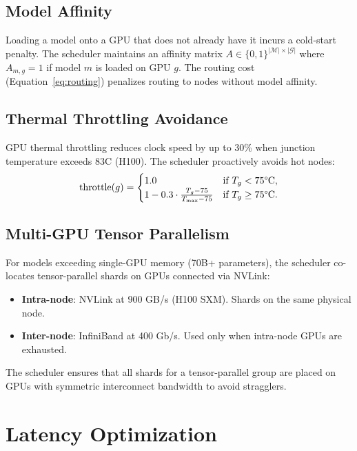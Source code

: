 \documentclass[11pt]{article}
\begin{document}
\subsection{Model Affinity}

Loading a model onto a GPU that does not already have it incurs a cold-start
penalty. The scheduler maintains an affinity matrix $A \in \{0,1\}^{|\mathcal{M}|
\times |\mathcal{G}|}$ where $A_{m,g} = 1$ if model $m$ is loaded on GPU $g$.
The routing cost (Equation~\ref{eq:routing}) penalizes routing to nodes without
model affinity.

\subsection{Thermal Throttling Avoidance}

GPU thermal throttling reduces clock speed by up to 30\% when junction
temperature exceeds 83\textdegree C (H100). The scheduler proactively avoids
hot nodes:
\begin{equation}
\text{throttle}(g) = \begin{cases}
    1.0 & \text{if } T_g < 75\text{\textdegree C}, \\
    1 - 0.3 \cdot \frac{T_g - 75}{T_{\max} - 75} & \text{if } T_g \geq 75\text{\textdegree C}.
\end{cases}
\end{equation}

\subsection{Multi-GPU Tensor Parallelism}

For models exceeding single-GPU memory (70B+ parameters), the scheduler
co-locates tensor-parallel shards on GPUs connected via NVLink:
\begin{itemize}[leftmargin=1.1em]
    \item \textbf{Intra-node}: NVLink at 900 GB/s (H100 SXM). Shards on the
    same physical node.
    \item \textbf{Inter-node}: InfiniBand at 400 Gb/s. Used only when intra-node
    GPUs are exhausted.
\end{itemize}

The scheduler ensures that all shards for a tensor-parallel group are placed on
GPUs with symmetric interconnect bandwidth to avoid stragglers.

\section{Latency Optimization}
\label{sec:latency}
\end{document}
